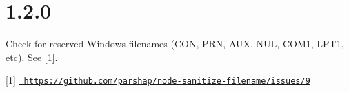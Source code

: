 \chapter{1.2.0}
\hypertarget{md__2_users_2hello_2_documents_2_git_hub_2finalproject-engine-drop-table-engines_2_engine_2src_2fe63bc3ec7bd3133a4a2fffa5c109f94}{}\label{md__2_users_2hello_2_documents_2_git_hub_2finalproject-engine-drop-table-engines_2_engine_2src_2fe63bc3ec7bd3133a4a2fffa5c109f94}
\label{md__2_users_2hello_2_documents_2_git_hub_2finalproject-engine-drop-table-engines_2_engine_2src_2fe63bc3ec7bd3133a4a2fffa5c109f94_autotoc_md9363}%
%


Check for reserved Windows filenames ({\ttfamily CON}, {\ttfamily PRN}, {\ttfamily AUX}, {\ttfamily NUL}, {\ttfamily COM1}, {\ttfamily LPT1}, etc). See \mbox{[}1\mbox{]}.

\mbox{[}1\mbox{]} \href{https://github.com/parshap/node-sanitize-filename/issues/9}{\texttt{ https\+://github.\+com/parshap/node-\/sanitize-\/filename/issues/9}} 
